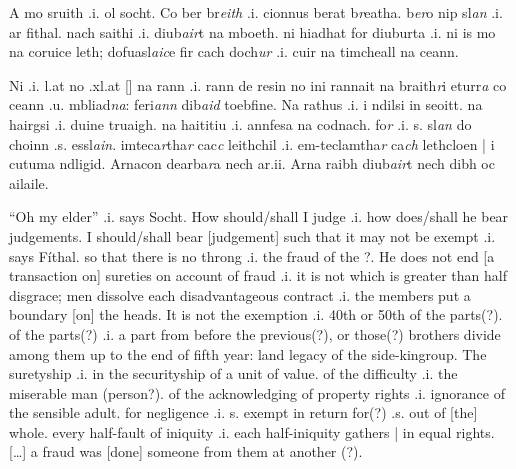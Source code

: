 \documentclass[11pt]{article}
\begin{document}
\begin{pages}
  \begin{Leftside}
    \beginnumbering\pstart

    A mo sruith .i. ol socht. Co ber br\emph{eith} .i. cionnus berat b\emph{r}eatha.  b\emph{er}o nip sl\emph{an} .i. ar fithal.  nach saithi .i. diub\emph{air}t na mboeth.  ni hiadhat  for diuburta .i. ni is mo na coruice leth; dofuasl\emph{aic}e fir cach doch\emph{ur} .i. cuir na  timcheall na ceann. 
    \pend

    \pstart
    Ni  .i. l.at no .xl.at [\hspace{2mm}] na rann .i. rann de resin  no ini rannait na braith\emph{r}i eturr\emph{a} co ceann .u. mbliad\emph{na}: feri\emph{ann} dib\emph{aid} toebfine.  Na rathus .i. i ndilsi in seoitt. na hairgsi .i. duine truaigh.  na haititiu .i. annfesa na codnach.  fo\emph{r}  .i. s. sl\emph{an} do choinn .s. essl\emph{ain}. imteca\emph{r}tha\emph{r} cac\emph{c} leithchil  .i. em-teclamtha\emph{r} ca\emph{ch} lethcloen | i cutuma ndligid.  Arnacon dearba\emph{r}a nech ar.ii.  Arna raibh diub\emph{air}t nech dibh oc ailaile.
    \pend
    \endnumbering
  \end{Leftside}

  \begin{Rightside}
    \beginnumbering\pstart
    \enquote{Oh my elder} .i. says Socht.  How should/shall I judge .i. how does/shall he bear judgements.  I should/shall bear [judgement] such that it may not be exempt .i. says F\'{i}thal. so that there is no throng .i. the fraud of the ?.  He does not end [a transaction on] sureties on account of fraud .i. it is not which is greater than half disgrace; men dissolve each disadvantageous contract .i. the members put a boundary [on] the heads.   
    \pend
    \pstart
    It is not the exemption .i. 40th or 50th of the parts(?). of the parts(?) .i. a part from before the previous(?), or those(?) brothers divide among them up to the end of fifth year: land legacy of the side-kingroup. The suretyship .i. in the securityship of a unit of value.  of the difficulty .i. the miserable man (person?). of the acknowledging of property rights .i. ignorance of the sensible adult. for negligence .i. s. exempt in return for(?) .s. out of [the] whole. every half-fault of iniquity .i. each half-iniquity gathers | in equal rights. [\ldots{}]  a fraud was [done] someone from them at another (?). 
    \pend
  \endnumbering
  \end{Rightside}
  \Pages
\end{pages}
\end{document}
